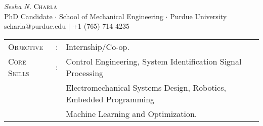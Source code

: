 \documentclass[letterpaper,10pt]{article}
\begin{document}
\begin{center}
\thispagestyle{empty}
\huge{\textit{Sesha N.} \textsc{Charla}}\\
\small PhD Candidate $\cdot$ School of Mechanical Engineering $\cdot$ Purdue University\\
\small scharla@purdue.edu $\mid$ +1 (765) 714 4235   \\
\end{center}



\begin{tabular}{l c l}
    {\large{\textsc{Objective}}}&:& Internship$/$Co-op.\\
{\large{\textsc{Core Skills}}}&:& Control Engineering, System Identification Signal Processing\\
 & & Electromechanical Systems Design, Robotics, Embedded Programming\\
     & & Machine Learning and Optimization.\\
\end{tabular}

\end{document}
